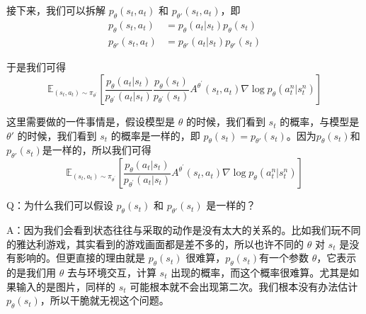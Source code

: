 接下来，我们可以拆解 $p_{\theta}\left(s_{t}, a_{t}\right)$ 和 $p_{\theta'}\left(s_{t}, a_{t}\right)$，即
\begin{equation}
    \label{eq:}
    \begin{aligned}
        p_{\theta}\left(s_{t}, a_{t}\right)&=p_{\theta}\left(a_{t}|s_{t}\right) p_{\theta}(s_t) \\
        p_{\theta'}\left(s_{t}, a_{t}\right)&=p_{\theta'}\left(a_{t}|s_{t}\right) p_{\theta'}(s_t) 
        \end{aligned}
\end{equation}

于是我们可得
\begin{equation}
    \label{eq:}
    \mathbb{E}_{\left(s_{t}, a_{t}\right) \sim \pi_{\theta^{\prime}}}\left[\frac{p_{\theta}\left(a_{t} | s_{t}\right)}{p_{\theta^{\prime}}\left(a_{t} | s_{t}\right)} \frac{p_{\theta}\left(s_{t}\right)}{p_{\theta^{\prime}}\left(s_{t}\right)} A^{\theta^{\prime}}\left(s_{t}, a_{t}\right) \nabla \log p_{\theta}\left(a_{t}^{n} | s_{t}^{n}\right)\right]
\end{equation}

这里需要做的一件事情是，假设模型是 $\theta$ 的时候，我们看到 $s_t$ 的概率，与模型是 $\theta'$  的时候，我们看到 $s_t$ 的概率是一样的，即 $p_{\theta}(s_t)=p_{\theta'}(s_t)$。因为$p_{\theta}(s_t)$和$p_{\theta'}(s_t)$是一样的，所以我们可得
\begin{equation}
    \label{eq:gradient}
    \mathbb{E}_{\left(s_{t}, a_{t}\right) \sim \pi_{\theta^{\prime}}}\left[\frac{p_{\theta}\left(a_{t} | s_{t}\right)}{p_{\theta^{\prime}}\left(a_{t} | s_{t}\right)} A^{\theta^{\prime}}\left(s_{t}, a_{t}\right) \nabla \log p_{\theta}\left(a_{t}^{n} | s_{t}^{n}\right)\right]  
\end{equation}


Q：为什么我们可以假设 $p_{\theta}(s_t)$ 和 $p_{\theta'}(s_t)$ 是一样的？

A：因为我们会看到状态往往与采取的动作是没有太大的关系的。比如我们玩不同的雅达利游戏，其实看到的游戏画面都是差不多的，所以也许不同的 $\theta$  对 $s_t$ 是没有影响的。但更直接的理由就是 $p_{\theta}(s_t)$ 很难算，$p_{\theta}(s_t)$有一个参数 $\theta$，它表示的是我们用 $\theta$ 去与环境交互，计算 $s_t$ 出现的概率，而这个概率很难算。尤其是如果输入的是图片，同样的 $s_t$ 可能根本就不会出现第二次。我们根本没有办法估计$p_{\theta}(s_t)$，所以干脆就无视这个问题。

